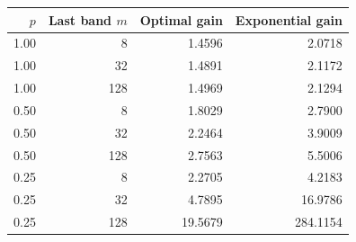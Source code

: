 \begin{tabular}{rrrr}
\toprule
$p$ & Last band $m$ & Optimal gain & Exponential gain \\
\midrule
1.00 & 8 & 1.4596 & 2.0718 \\
1.00 & 32 & 1.4891 & 2.1172 \\
1.00 & 128 & 1.4969 & 2.1294 \\
0.50 & 8 & 1.8029 & 2.7900 \\
0.50 & 32 & 2.2464 & 3.9009 \\
0.50 & 128 & 2.7563 & 5.5006 \\
0.25 & 8 & 2.2705 & 4.2183 \\
0.25 & 32 & 4.7895 & 16.9786 \\
0.25 & 128 & 19.5679 & 284.1154 \\
\bottomrule
\end{tabular}
